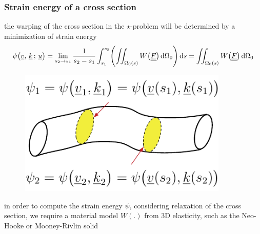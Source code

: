 \begin{frame}
  \frametitle{Strain energy of a cross section}

  the warping of the cross section in the $\star$-problem will be determined by a minimization of strain energy
  \begin{displaymath} %
    \psi \bigl( \underline{v} , \, \underline{k} \, ; \, \underline{u} \bigr) =
    \lim_{s_2 \to s_1} \frac{1}{s_2 - s_1} \int_{s_1}^{s_2}  \Biggl( \iint_{\Omega_0(s)} W \bigl( \doubleunderline{F} \bigr) \dif \Omega_0 \Biggr) \dif s =
    \iint_{\Omega_0(s)} W \bigl( \doubleunderline{F} \bigr) \dif \Omega_0
  \end{displaymath}

  \vspace{0.3em}
  \begin{figure}
    \centering
    \includegraphics[width=10cm, keepaspectratio=true]{sections/cosserat_rods/images/LocalEnergy}
  \end{figure}
  
  \vspace{0.5em}
  in order to compute the strain energy $\psi$, considering relaxation of the cross section,
  we require a material model $W(.)$ from 3D elasticity, such as the Neo-Hooke or Mooney-Rivlin solid
  
\end{frame}


